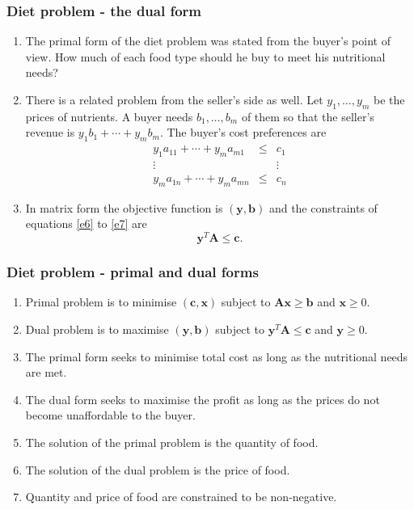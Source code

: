 \documentclass{beamer}
\begin{document}
\begin{frame}
\frametitle{Diet problem - the dual form}
\begin{enumerate}
\item The primal form of the diet problem was stated from the buyer's point of
view. How much of each food type should he buy to meet his nutritional needs?
\item There is a related problem from the seller's side as well. Let $y_1, 
\ldots, y_m$ be the prices of nutrients. A buyer needs $b_1, \ldots, b_m$ of 
them so that the seller's revenue is $y_1b_1 + \cdots + y_mb_m$. The buyer's 
cost preferences are
\begin{eqnarray}
y_1a_{11} + \cdots + y_ma_{m1} &\le& c_1 \label{e6} \\
\vdots & & \vdots \nonumber \\
y_ma_{1n} + \cdots + y_ma_{mn} &\le& c_n \label{e7}
\end{eqnarray}
\item In matrix form the objective function is $(\bm{y}, \bm{b})$ and the 
constraints of equations \eqref{e6} to \eqref{e7} are
\begin{equation}\label{e8}
\bm{y}^T\bm{A} \le \bm{c}.
\end{equation}
\end{enumerate}
\end{frame}

\begin{frame}
\frametitle{Diet problem - primal and dual forms}
\begin{enumerate}
\item Primal problem is to minimise $(\bm{c}, \bm{x})$ subject to 
$\bm{A}\bm{x} \ge \bm{b}$ and $\bm{x} \ge 0$.
\item Dual problem is to maximise $(\bm{y}, \bm{b})$ subject to 
$\bm{y}^T\bm{A} \le \bm{c}$ and $\bm{y} \ge 0$.
\item The primal form seeks to minimise total cost as long as the nutritional
needs are met.
\item The dual form seeks to maximise the profit as long as the prices do not 
become unaffordable to the buyer.
\item The solution of the primal problem is the quantity of food.
\item The solution of the dual problem is the price of food.
\item Quantity and price of food are constrained to be non-negative.
\end{enumerate}
\end{frame}
\end{document}
